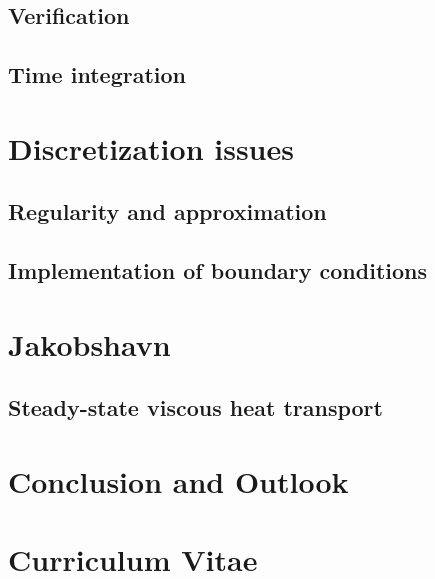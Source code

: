 \documentclass[a4paper,twoside,11pt,pdftex]{report}
\begin{document}
\section{Verification}\label{sec:verification}


\section{Time integration}\label{sec:timestep}


\cleardoublepage
\chapter{Discretization issues}\label{chap:discretization}
\section{Regularity and approximation}\label{sec:regularity}


\section{Implementation of boundary conditions}\label{sec:slip}


\cleardoublepage
% 

\chapter{Jakobshavn}\label{chap:jakobshavn}


\section{Steady-state viscous heat transport}\label{sec:vht}


\cleardoublepage

\chapter{Conclusion and Outlook}\label{chap:outlook}

\cleardoublepage



\cleardoublepage

\appendix

\pagestyle{plain}
\chapter*{Curriculum Vitae}
\end{document}
